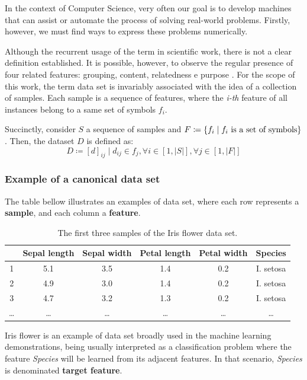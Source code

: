 \documentclass[12pt]{article}
\begin{document}
In the context of Computer Science, very often our goal is to develop machines that can assist or automate the process of solving real-world problems. Firstly, however, we must find ways to express these problems numerically.

Although the recurrent usage of the term in scientific work, there is not a clear definition established. It is possible, however, to observe the regular presence of four related features: grouping, content, relatedness e purpose \cite{ren2010}.
For the scope of this work, the term data set is invariably associated with the idea of a collection of samples. Each sample is a sequence of features, where the {\em i-th} feature of all instances belong to a same set of symbols $f_i$.

Succinctly, consider $S$ a sequence of samples and
$F \coloneqq  \{f_i \mid f_i \textnormal{ is a set of symbols}\}$. Then, the dataset $D$ is defined as:
$$D\coloneqq [d]_{ij} \mid d_{ij} \in f_j, \forall i \in [1, |S|], \forall j \in [1, |F|]$$

\subsubsection{Example of a canonical data set} \label{irisdataset}

The table bellow illustrates an examples of data set, where each row represents a \textbf{sample}, and each column a \textbf{feature}.

\begin{table}[H]
	\begin{tabular}{ c || *{5}{c|}}
		& \textbf{Sepal length} & \textbf{Sepal width} & \textbf{Petal length} & \textbf{Petal width} & \textbf{Species} \\
		\hline
		1 & 5.1	& 3.5 & 1.4 & 0.2 & I. setosa \\
		2 & 4.9 & 3.0 & 1.4 & 0.2 & I. setosa \\
		3 & 4.7 & 3.2 & 1.3 & 0.2 & I. setosa \\
		… & … & … & … & … & … \\
	\end{tabular}
	\caption{The first three samples of the Iris flower data set.}
\end{table}

Iris flower is an example of data set broadly used in the machine learning demonstrations, being usually interpreted as a classification problem where the feature {\em Species} will be learned from its adjacent features. In that scenario, {\em Species} is denominated \textbf{target feature}.
\end{document}
